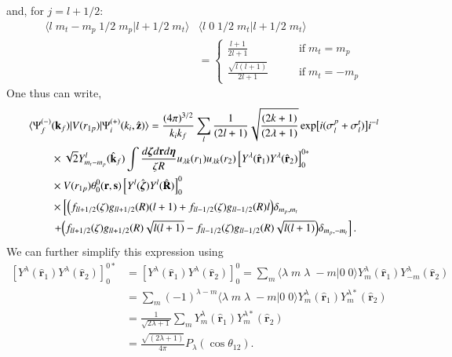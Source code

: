 and, for $j=l+1/2$:
 \begin{equation}\label{eq7_2_18}
 \begin{split}
\langle l \;m_t-m_p\;1/2\;m_p|l+1/2\;m_t\rangle & \langle l \;0\;1/2\;m_t|l+1/2\;m_t\rangle\\
&=\left\{
\begin{aligned}
\frac{l+1}{2l+1} \qquad &\text{if}\; m_t=m_p\\
\frac{\sqrt{l(l+1)}}{2l+1}\qquad &\text{if} \;m_t=-m_p
\end{aligned}
\right.
\end{split}
\end{equation}
One thus can write,
\begin{equation}\label{eq102}
  \begin{split}
  \langle \Psi_f^{(-)}&(\mathbf{k}_f)|V(r_{1p})|\Psi_i^{(+)}(k_i,\hat {\mathbf{z}})\rangle=\frac{(4\pi)^{3/2}}{k_ik_f}\sum_{l}
  \frac{1}{(2l+1)}\sqrt{\frac{(2k+1)}{(2\lambda+1)}}\exp\bigl[i(\sigma_{l}^p+\sigma_{l}^t)\bigr]i^{-l}\\
  &\times \sqrt 2 Y_{m_t-m_p}^{l}(\hat{\mathbf{k}}_f) \int \frac {d\boldsymbol{\zeta}d\mathbf{r}d\boldsymbol{\eta}}{\zeta R} u_{\lambda k}(r_1)u_{\lambda k}(r_2)\left[Y^{\lambda}(\hat{\mathbf{r}}_1)Y^{\lambda}(\hat{\mathbf{r}}_2)\right]^{0*}_{0}\\
  &\times  V(r_{1p})\theta_0^0(\mathbf{r},\mathbf{s})
  \left[Y^{l}(\hat{\boldsymbol{\zeta}})Y^{l}(\hat{\mathbf{R}})\right]^{0}_{0}\\
  &\times \left[\Bigl(f_{ll+1/2}(\zeta)g_{ll+1/2}(R)(l+1)+f_{ll-1/2}(\zeta)g_{ll-1/2}(R)l\Bigr)\delta_{m_p,m_t}\right.\\
  &\left.+\Bigl(f_{ll+1/2}(\zeta)g_{ll+1/2}(R)\sqrt{l(l+1)}-f_{ll-1/2}(\zeta)g_{ll-1/2}(R)\sqrt{l(l+1)}\Bigr)\delta_{m_p,-m_t}\right].
  \end{split}
\end{equation}
We can further simplify this expression using
\begin{equation}\label{eq103}
  \begin{split}
\left[Y^{\lambda}(\hat{\mathbf{r}}_1)Y^{\lambda}(\hat{\mathbf{r}}_2)\right]^{0*}_{0}&=
\left[Y^{\lambda}(\hat{\mathbf{r}}_1)Y^{\lambda}(\hat{\mathbf{r}}_2)\right]^{0}_{0}=\sum_m \langle \lambda \;m\;\lambda\;-m|0\;0\rangle Y^{\lambda}_m(\hat{\mathbf{r}}_1)Y^{\lambda}_{-m}(\hat{\mathbf{r}}_2)\\
&=\sum_m (-1)^{\lambda-m} \langle \lambda \;m\;\lambda\;-m|0\;0\rangle Y^{\lambda}_m(\hat{\mathbf{r}}_1)Y^{\lambda*}_{m}(\hat{\mathbf{r}}_2)\\
& =\frac{1}{\sqrt{2\lambda+1}}\sum_m Y^{\lambda}_m(\hat{\mathbf{r}}_1)Y^{\lambda*}_{m}(\hat{\mathbf{r}}_2)\\
&=\frac{\sqrt{(2\lambda+1)}}{4\pi}P_\lambda(\cos \theta_{12}).
  \end{split}
\end{equation}
